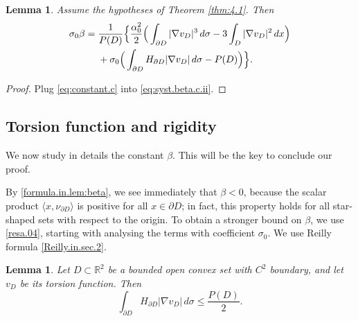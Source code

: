 \documentclass[10pt,reqno,a4paper]{article}
\numberwithin{equation}{section}
\theoremstyle{plain}
\newtheorem{lemma}[theorem]{Lemma}
\theoremstyle{definition}
\newcommand{\R}{{\mathbb R}}
\newcommand{\la}{\langle}
\newcommand{\ra}{\rangle}
\newcommand{\pa}{\partial}
\begin{document}
\begin{lemma} \label{teo:consequence}
Assume the hypotheses of Theorem \ref{thm:4.1}. Then 
\begin{align} 
\sigma_0 \beta  
& = \frac{1}{P(D)} \Big\{ 
\frac{\alpha_0^2}{2} 
\Big( \int_{\pa D} |\nabla v_D|^{3}\, d\sigma - 3 \int_{D} |\nabla v_D|^2\,dx \Big) 
\notag \\ 
& \quad \ 
+ \sigma_0 \Big( \int_{\pa D} H_{\pa D} |\nabla v_D| \, d\sigma - P(D) \Big) \Big\}.
\label{resa.04}  
\end{align}
\end{lemma}

\begin{proof}
Plug \eqref{eq:constant.c} into \eqref{eq:syst.beta.c.ii}.
\end{proof}



\subsection{Torsion function and rigidity} 
\label{sec:global}

We now study in details the constant $\beta$. 
This will be the key to conclude our proof.

By \eqref{formula.in.lem:beta}, 
we see immediately that $\beta<0$, 
because the scalar product $\la x,\nu_{\pa D}\ra$ is positive 
for all $x \in \pa D$; in fact, this property holds for all star-shaped sets 
with respect to the origin.
To obtain a stronger bound on $\beta$, 
we use \eqref{resa.04}, starting with analysing the terms with coefficient $\sigma_0$. 
We use Reilly formula \eqref{Reilly.in.sec.2}.

\begin{lemma}\label{lem:reilly}
Let $D \subset \R^2$ be a bounded open convex set with $C^2$ boundary, 
and let $v_D$ be its torsion function. Then
\begin{equation}\label{eq:grad.curvature}
\int_{\pa D} H_{\pa D} |\nabla v_D|\, d\sigma \leq \frac{P(D)}{2}.
\end{equation}
\end{lemma}
\end{document}
